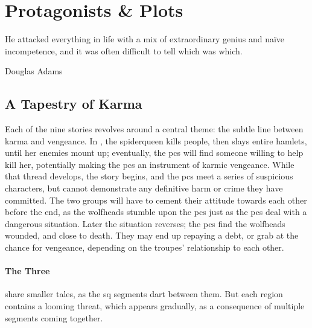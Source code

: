 \chapter{Protagonists \& Plots}
  \epigraph{He attacked everything in life with a mix of extraordinary genius and na\"ive incompetence, and it was often difficult to tell which was which.}{Douglas Adams}
\label{sideQuestIntro}

\section{A Tapestry of Karma}
\label{sqSummaries}

\begin{multicols}{2}


\noindent
Each of the nine stories revolves around a central theme: the subtle line between karma and vengeance.
In , the \gls{spiderqueen} kills people, then slays entire hamlets, until her enemies mount up; eventually, the \glspl{pc} will find someone willing to help kill her, potentially making the \glspl{pc} an instrument of karmic vengeance.
While that thread develops, the  story begins, and the \glspl{pc} meet a series of suspicious characters, but cannot demonstrate any definitive harm or crime they have committed.
The two groups will have to cement their attitude towards each other before the end, as the \glspl{wolfhead} stumble upon the \glspl{pc} just as the \glspl{pc} deal with a dangerous situation.
Later the situation reverses; the \glspl{pc} find the \glspl{wolfhead} wounded, and close to death.
They may end up repaying a debt, or grab at the chance for vengeance, depending on the troupes' relationship to each other.


\subsubsection{The Three }
share smaller tales, as the \gls{sq} \glspl{segment} dart between them.
But each \gls{region} contains a looming threat, which appears gradually, as a consequence of multiple \glspl{segment} coming together.



\renewcommand\csComments{
  \mapCircle{16}{76}{1.7}{Dyson_Logos/bandit_camp}
  \mapCircle{35}{88}{2}{Dyson_Logos/forgotten_city}
  \mapCircle{27}{09}{2}{Dyson_Logos/qualme_temple}
  \mapCircle[4]{56}{52}{2.5}{Dyson_Logos/town}
  \mapCircle{44}{41}{2}{Dyson_Logos/redfall}
  \mapCircle{83}{09}{1.7}{Dyson_Logos/shadow_gate}
  \mapCircle{86}{45}{1.7}{Dyson_Logos/lochside}
  \draw[very thick,white] (11,0.6) -- (12,0.6) node[anchor=north]{\outline{10 Miles}} -- (13,0.6) ;
}


\end{multicols}
